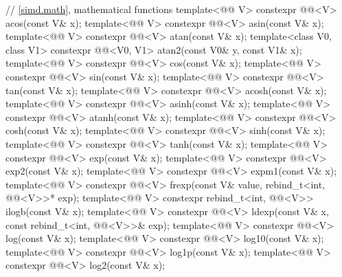 \begin{codeblock}
{  // \ref{simd.math}, mathematical functions
  template<@@ V> constexpr @@<V> acos(const V& x);
  template<@@ V> constexpr @@<V> asin(const V& x);
  template<@@ V> constexpr @@<V> atan(const V& x);
  template<class V0, class V1>
    constexpr @@<V0, V1> atan2(const V0& y, const V1& x);
  template<@@ V> constexpr @@<V> cos(const V& x);
  template<@@ V> constexpr @@<V> sin(const V& x);
  template<@@ V> constexpr @@<V> tan(const V& x);
  template<@@ V> constexpr @@<V> acosh(const V& x);
  template<@@ V> constexpr @@<V> asinh(const V& x);
  template<@@ V> constexpr @@<V> atanh(const V& x);
  template<@@ V> constexpr @@<V> cosh(const V& x);
  template<@@ V> constexpr @@<V> sinh(const V& x);
  template<@@ V> constexpr @@<V> tanh(const V& x);
  template<@@ V> constexpr @@<V> exp(const V& x);
  template<@@ V> constexpr @@<V> exp2(const V& x);
  template<@@ V> constexpr @@<V> expm1(const V& x);
  template<@@ V>
    constexpr @@<V>
      frexp(const V& value, rebind_t<int, @@<V>>* exp);
  template<@@ V>
    constexpr rebind_t<int, @@<V>> ilogb(const V& x);
  template<@@ V>
    constexpr @@<V> ldexp(const V& x, const rebind_t<int, @@<V>>& exp);
  template<@@ V> constexpr @@<V> log(const V& x);
  template<@@ V> constexpr @@<V> log10(const V& x);
  template<@@ V> constexpr @@<V> log1p(const V& x);
  template<@@ V> constexpr @@<V> log2(const V& x);
}
\end{codeblock}
